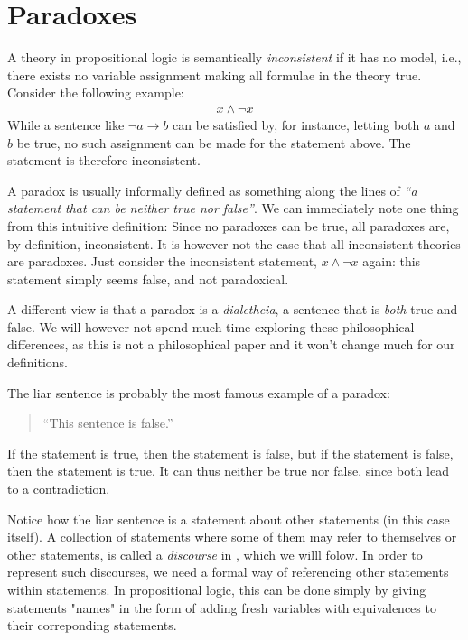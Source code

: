 \section{Paradoxes}
\label{sec:Paradoxes}
A theory in propositional logic is semantically \textit{inconsistent} if it has no model, i.e., there exists no variable assignment making all formulae in the theory true.
Consider the following example:
\begin{align}
  x \wedge \neg x
\end{align}
While a sentence like $\neg a \rightarrow b$ can be satisfied by, for instance, letting both $a$ and $b$ be true, no such assignment can be made for the statement above.
The statement is therefore inconsistent.

A paradox is usually informally defined as something along the lines of \textit{``a statement that can be neither true nor false''}.
We can immediately note one thing from this intuitive definition:
Since no paradoxes can be true, all paradoxes are, by definition, inconsistent.
It is however not the case that all inconsistent theories are paradoxes.
Just consider the inconsistent statement, $x \wedge \neg x$ again: this statement simply seems false, and not paradoxical.

A different view is that a paradox is a \textit{dialetheia}, a sentence that is \textit{both} true and false\cite{sep-dialetheism}. We will however not spend much time exploring these philosophical differences, as this is not a philosophical paper and it won't change much for our definitions.

The liar sentence is probably the most famous example of a paradox:
\begin{quote}
  ``This sentence is false.''
\end{quote}
If the statement is true, then the statement is false, but if the statement is false, then the statement is true.
It can thus neither be true nor false, since both lead to a contradiction.

Notice how the liar sentence is a statement about other statements (in this case itself).
A collection of statements where some of them may refer to themselves or other statements, is called a \textit{discourse} in \cite{synthese-pdl}, which we willl folow.
In order to represent such discourses, we need a formal way of referencing other statements within statements.
In propositional logic, this can be done simply by giving statements "names" in the form of adding fresh variables with equivalences to their correponding statements.

